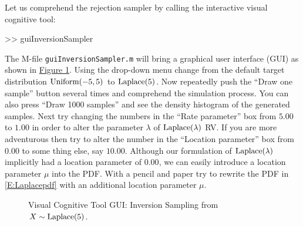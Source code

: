 \begin{labwork}\label{LW:guiInversionSamplerLaplace}
Let us comprehend the rejection sampler by calling the interactive visual cognitive tool:
\begin{VrbM}
>> guiInversionSampler
\end{VrbM}
The M-file {\tt guiInversionSampler.m} will bring a graphical user interface (GUI) as shown in \hyperref[F:guiInversionSamplerLaplace]{Figure \ref*{F:guiInversionSamplerLaplace}}.  Using the drop-down menu change from the default target distribution $\mbox{{\rm Uniform}}(-5,5)$ to $\mbox{{\rm Laplace}}(5)$.  Now repeatedly push the ``Draw one sample'' button several times and comprehend the simulation process.  You can also press ``Draw 1000 samples'' and see the density histogram of the generated samples.  
Next try changing the numbers in the ``Rate parameter'' box from $5.00$ to $1.00$ in order to alter the parameter $\lambda$ of $\mbox{{\rm Laplace}}(\lambda)$ RV.  If you are more adventurous then try to alter the number in the ``Location parameter'' box from $0.00$ to some thing else, say $10.00$.  Although our formulation of $\mbox{{\rm Laplace}}(\lambda)$ implicitly had a location parameter of $0.00$, we can easily introduce a location parameter $\mu$ into the PDF.  With a pencil and paper try to rewrite the PDF in \eqref{E:Laplacepdf} with an additional location parameter $\mu$.
\end{labwork}

\begin{figure}[htpb]
\caption{Visual Cognitive Tool GUI: Inversion Sampling from $X \sim \mbox{{\rm Laplace}}(5)$.\label{F:guiInversionSamplerLaplace}}
\centering   {}
\end{figure}

